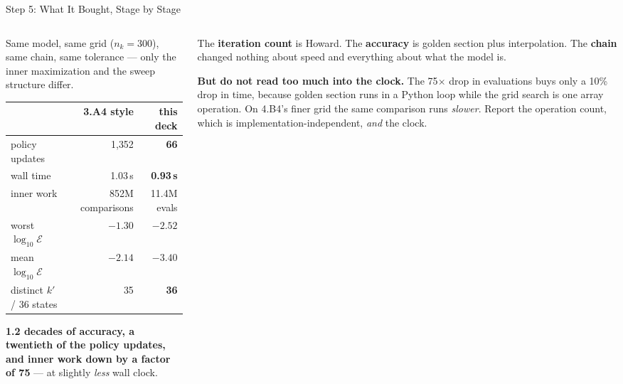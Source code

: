 \begin{frame}{Step 5: What It Bought, Stage by Stage}
\begin{columns}[T]
\begin{column}{0.55\textwidth}
\small
Same model, same grid ($n_k=300$), same chain, same tolerance --- only the inner maximization and the sweep structure differ.
\medskip
\begin{center}\footnotesize
\begin{tabularx}{\linewidth}{@{}>{\raggedright\arraybackslash}X r r@{}}
\toprule
 & \textbf{3.A4 style} & \textbf{this deck} \\
\midrule
policy updates & 1{,}352 & \textbf{66} \\
wall time & 1.03\,s & \textbf{0.93\,s} \\
inner work & 852M comparisons & 11.4M evals \\
worst $\log_{10}\mathcal{E}$ & $-1.30$ & $\mathbf{-2.52}$ \\
mean $\log_{10}\mathcal{E}$ & $-2.14$ & $\mathbf{-3.40}$ \\
distinct $k'$ / 36 states & 35 & \textbf{36} \\
\bottomrule
\end{tabularx}
\end{center}
\medskip
\footnotesize
\textbf{1.2 decades of accuracy, a twentieth of the policy updates, and inner work down by a factor of 75} --- at slightly \emph{less} wall clock. 
\end{column}
\begin{column}{0.42\textwidth}
\begin{takeawaybox}[title=\textbf{Where each gain came from}]\small
The \textbf{iteration count} is Howard. The \textbf{accuracy} is golden section plus interpolation. The \textbf{chain} changed nothing about speed and everything about what the model is.
\end{takeawaybox}
\medskip
\begin{cautionbox}\footnotesize
\textbf{But do not read too much into the clock.} The 75$\times$ drop in evaluations buys only a 10\% drop in time, because golden section runs in a Python loop while the grid search is one array operation. On 4.B4's finer grid the same comparison runs \emph{slower}. Report the operation count, which is implementation-independent, \emph{and} the clock.
\end{cautionbox}
\end{column}
\end{columns}
\end{frame}

